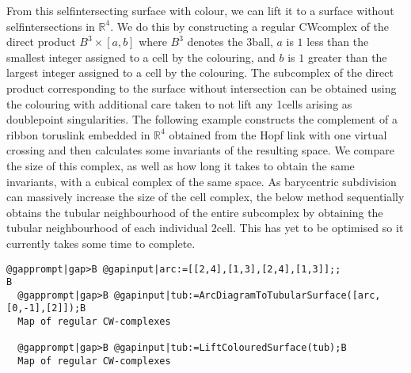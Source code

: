 \documentclass[a4paper,11pt]{report}
\begin{document}
{{\begin{Verbatim}[commandchars=@|B,fontsize=\small,frame=single,label=Example]
\end{Verbatim}
 From this self\texttt{}intersecting surface with colour, we can
lift it to a surface without self\texttt{}intersections in $\mathbb{R}^4$. We do this by constructing a regular CW\texttt{}complex of the
direct product $B^3 \times [a,b]$ where $B^3$ denotes the $3$\texttt{}ball, $a$ is $1$ less than the smallest integer assigned to a cell by the colouring, and $b$ is $1$ greater than the largest integer assigned to a cell by the colouring. The
subcomplex of the direct product corresponding to the surface without
intersection can be obtained using the colouring with additional care taken to
not lift any 1\texttt{}cells arising as
double\texttt{}point singularities. The following example
constructs the complement of a ribbon torus\texttt{}link embedded
in $\mathbb{R}^4$ obtained from the Hopf link with one virtual crossing and then calculates some
invariants of the resulting space. We compare the size of this complex, as
well as how long it takes to obtain the same invariants, with a cubical
complex of the same space. As barycentric subdivision can massively increase
the size of the cell complex, the below method sequentially obtains the
tubular neighbourhood of the entire subcomplex by obtaining the tubular
neighbourhood of each individual $2$\texttt{}cell. This has yet to be optimised so it currently takes
some time to complete. 
\begin{Verbatim}[commandchars=@|B,fontsize=\small,frame=single,label=Example]
  @gapprompt|gap>B @gapinput|arc:=[[2,4],[1,3],[2,4],[1,3]];;                B
  @gapprompt|gap>B @gapinput|tub:=ArcDiagramToTubularSurface([arc,[0,-1],[2]]);B
  Map of regular CW-complexes
  
  @gapprompt|gap>B @gapinput|tub:=LiftColouredSurface(tub);B
  Map of regular CW-complexes
  

\end{Verbatim}}}
\end{document}
